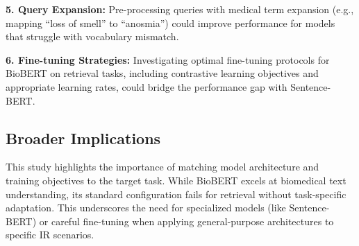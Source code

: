 \documentclass[sigconf,nonacm]{acmart}
\begin{document}
\textbf{5. Query Expansion:} Pre-processing queries with medical term expansion (e.g., mapping ``loss of smell'' to ``anosmia'') could improve performance for models that struggle with vocabulary mismatch.

\textbf{6. Fine-tuning Strategies:} Investigating optimal fine-tuning protocols for BioBERT on retrieval tasks, including contrastive learning objectives and appropriate learning rates, could bridge the performance gap with Sentence-BERT.

\subsection{Broader Implications}
This study highlights the importance of matching model architecture and training objectives to the target task. While BioBERT excels at biomedical text understanding, its standard configuration fails for retrieval without task-specific adaptation. This underscores the need for specialized models (like Sentence-BERT) or careful fine-tuning when applying general-purpose architectures to specific IR scenarios.



\end{document}
